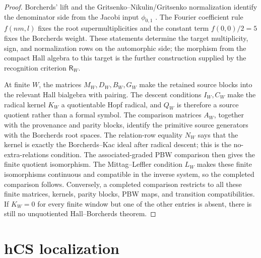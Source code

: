 \begin{proof}
Borcherds' lift and the Gritsenko--Nikulin/Gritsenko normalization
identify the denominator side from the Jacobi input
\(\phi_{0,1}\) \cite{Borcherds1998,Gritsenko1999}. The Fourier coefficient rule $f(n m, l)$ fixes the root
supermultiplicities and the constant term $f(0, 0)/2 = 5$ fixes the
Borcherds weight. These statements determine the target multiplicity,
sign, and normalization rows on the automorphic side; the morphism
from the compact Hall algebra to this target is the further
construction supplied by the recognition criterion $\mathsf R_W$.

At finite \(W\), the matrices \(M_W,D_W,B_W,G_W\) make the retained
source blocks into the relevant Hall bialgebra with pairing. The
descent conditions \(I_W,C_W\) make the radical kernel \(K_W\) a
quotientable Hopf radical, and \(Q_W\) is therefore a source quotient
rather than a formal symbol. The comparison matrices \(A_W\), together
with the provenance and parity blocks, identify the primitive source
generators with the Borcherds root spaces. The relation-row equality
\(N_W\) says that the kernel is exactly the Borcherds--Kac ideal after
radical descent; this is the no-extra-relations condition. The
associated-graded PBW comparison then gives the finite quotient
isomorphism. The Mittag--Leffler condition \(L_W\) makes these finite
isomorphisms continuous and compatible in the inverse system, so the
completed comparison follows. Conversely, a completed comparison
restricts to all these finite matrices, kernels, parity blocks, PBW
maps, and transition compatibilities. If \(K_W=0\) for every finite
window but one of the other entries is absent, there is still no
unquotiented Hall--Borcherds theorem.
\end{proof}

\section{hCS localization}

